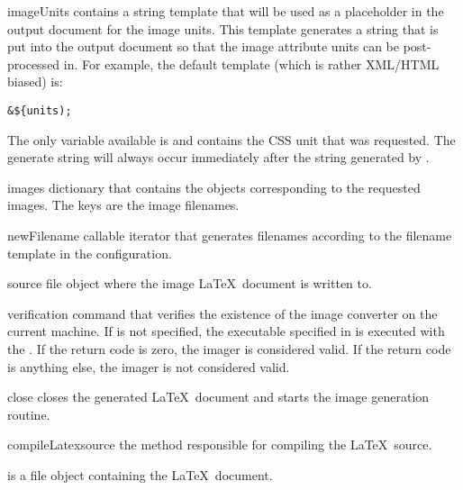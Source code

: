 \begin{memberdesc}[Imager]{imageUnits}
contains a string template that will be used as a placeholder in the 
output document for the image units.  This template generates a string
that is put into the output document so that the image attribute units
can be post-processed in.  For example, the default template (which is 
rather XML/HTML biased) is:
\begin{verbatim}
&${units);
\end{verbatim}
The only variable available is  and contains the CSS unit
that was requested.  The generate string will always occur immediately
after the string generated by .
\end{memberdesc}

\begin{memberdesc}[Imager]{images}
dictionary that contains the  objects corresponding to
the requested images.  The keys are the image filenames.
\end{memberdesc}

\begin{memberdesc}[Imager]{newFilename}
callable iterator that generates filenames according to the filename template
in the configuration.
\end{memberdesc}

\begin{memberdesc}[Imager]{source}
file object where the image \LaTeX\ document is written to.
\end{memberdesc}

\begin{memberdesc}[Imager]{verification}
command that verifies the existence of the image converter on the current
machine.  If  is not specified, the executable 
specified in  is executed with the .
If the return code is zero, the imager is considered valid.  If the
return code is anything else, the imager is not considered valid.
\end{memberdesc}


\begin{methoddesc}[Imager]{close}{}
closes the generated \LaTeX\ document and starts the image generation routine.
\end{methoddesc}

\begin{methoddesc}[Imager]{compileLatex}{source}
the method responsible for compiling the \LaTeX\ source.

 is a file object containing the \LaTeX\ document.
\end{methoddesc}


